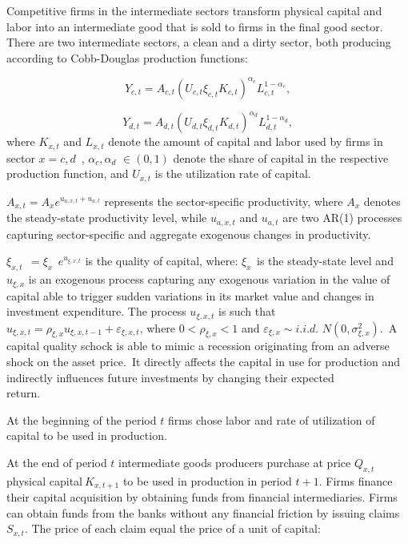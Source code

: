 \documentclass{article}
\begin{document}
Competitive firms in the intermediate sectors transform physical capital and
labor into an intermediate good that is sold to firms in the final good
sector. There are two intermediate sectors, a clean and a dirty sector, both
producing according to Cobb-Douglas production functions:

\begin{equation*}
Y_{c,t}=A_{c,t}\left( U_{c,t}\xi _{c,t}K_{c,t}\right) ^{\alpha
_{c}}L_{c,t}^{1-\alpha _{c}},
\end{equation*}

\begin{equation*}
Y_{d,t}=A_{d,t}\left( U_{d,t}\xi _{d,t}K_{d,t}\right) ^{\alpha
_{d}}L_{d,t}^{1-\alpha _{d}},
\end{equation*}%
where $K_{x,t}$ and $L_{x,t}$ denote the amount of capital and labor used by
firms in sector $x=c,d$\ , $\alpha _{c},\alpha _{d}$ $\in (0,1)$ denote the
share of capital in the respective production function, and $U_{x,t}$ is the
utilization rate of capital.

$A_{x,t}=A_{x}e^{u_{a,x,{t}}+u_{a,t}}$ represents the sector-specific
productivity, where $A_{x}$ denotes the steady-state productivity level,
while $u_{a,x,{t}}$ and $u_{a,t}$ are two AR(1) processes capturing
sector-specific and aggregate exogenous changes in productivity.

$\xi _{x,t\text{ }}=\xi _{x\text{ }}e^{u_{\xi ,x,{t}}}$ is the quality of
capital, where: $\xi _{x\text{ }}$is the steady-state level and $u_{\xi ,x}$
is an exogenous process capturing any exogenous variation in the value of
capital able to trigger sudden variations in its market value and changes in
investment expenditure. The process $u_{\xi ,x,t}$ is such that $u_{\xi
,x,t}=\rho _{\xi ,x}u_{\xi ,x,t-1}+\varepsilon _{\xi ,x,t}$, where $0<\rho
_{\xi ,x}<1$ and $\varepsilon _{\xi ,x}\sim i.i.d.$ $N(0,\sigma _{\xi
,x}^{2}).$\ A capital quality schock is able to mimic a recession
originating from an adverse shock on the asset price.\ It directly affects
the capital in use for production and indirectly influences future
investments by changing their expected return.\ \ \ \ \ \ \ 

At the beginning of the period $t$ firms chose labor and rate of utilization
of capital to be used in production.

At the end of period $t$ intermediate goods producers purchase at price $%
Q_{x,t}$ physical capital$\ K_{x,t+1}$ to be used in production in period $%
t+1$. Firms finance their capital acquisition by obtaining funds from
financial intermediaries. Firms can obtain funds from the banks without any
financial friction by issuing claims $S_{x,t}$. The price of each claim
equal the price of a unit of capital:
\end{document}
